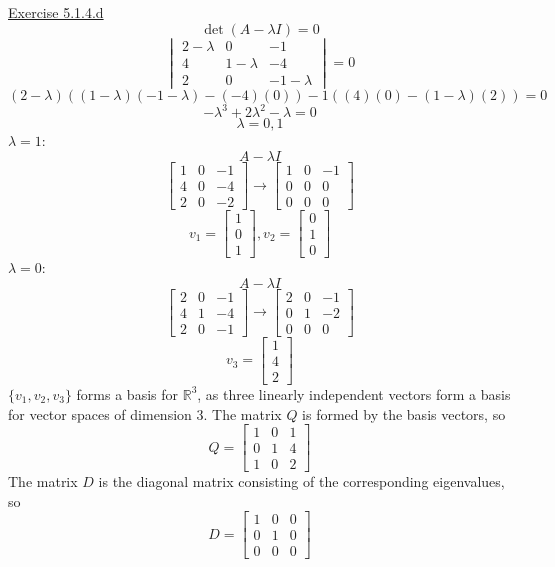 \documentclass{exam}
\begin{document}
\underline{Exercise 5.1.4.d}
\newline
\newline
\[\det{(A-\lambda I)}=0\]
\[
\begin{vmatrix}
    2-\lambda & 0 & -1 \\
    4 & 1-\lambda & -4 \\
    2 & 0 & -1-\lambda
\end{vmatrix}=0
\]
\[(2-\lambda)((1-\lambda)(-1-\lambda)-(-4)(0))-1((4)(0)-(1-\lambda)(2))=0\]
\[-\lambda^3+2\lambda^2-\lambda=0\]
\[\lambda=0,1\]
$\lambda=1:$
\[A-\lambda I\]
\[
\begin{bmatrix}
    1 & 0 & -1 \\
    4 & 0 & -4 \\
    2 & 0 & -2
\end{bmatrix}
\to
\begin{bmatrix}
    1 & 0 & -1 \\
    0 & 0 & 0 \\
    0 & 0 & 0
\end{bmatrix}
\]
\[v_1=
\begin{bmatrix}
    1 \\
    0 \\
    1
\end{bmatrix},v_2=
\begin{bmatrix}
    0 \\
    1 \\
    0
\end{bmatrix}
\]
$\lambda=0:$
\[A-\lambda I\]
\[
\begin{bmatrix}
    2 & 0 & -1 \\
    4 & 1 & -4 \\
    2 & 0 & -1
\end{bmatrix}
\to
\begin{bmatrix}
    2 & 0 & -1 \\
    0 & 1 & -2 \\
    0 & 0 & 0
\end{bmatrix}
\]
\[v_3=
\begin{bmatrix}
    1 \\
    4 \\
    2
\end{bmatrix}
\]
$\{v_1,v_2,v_3\}$ forms a basis for $\mathbb{R}^3$, as three linearly independent vectors form a basis for vector spaces of dimension 3. The matrix $Q$ is formed by the basis vectors, so
\[Q=
\begin{bmatrix}
    1 & 0 & 1 \\
    0 & 1 & 4 \\
    1 & 0 & 2
\end{bmatrix}
\]
The matrix $D$ is the diagonal matrix consisting of the corresponding eigenvalues, so
\[D=
\begin{bmatrix}
    1 & 0 & 0 \\
    0 & 1 & 0 \\
    0 & 0 & 0
\end{bmatrix}
\]
\newline
\end{document}
